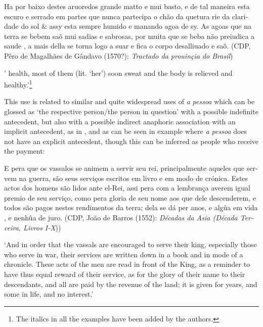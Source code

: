 \documentclass[output=paper]{langscibook}
\begin{document}
\eanoraggedright\label{ex:amaral:12}
\begin{otherlanguage}{portuguese}
Ha por baixo destes aruoredos grande matto e mui basto, e de tal maneira esta escuro e serrado em partes que nunca partecipa o chão da quetura rie da claridade do sol \& assy esta sempre humido e manando agoa de sy. As agoas que na terra se bebem saõ mui sadias e sabrosas, por muita que se beba não preiudica a saude  , a mais della se torna logo a suar e fica o corpo desalliuado e saõ. {(CDP, Pêro de Magalhães de Gândavo (1570?):} {\textit{Tractado da prouinçia do Brasil}})
\end{otherlanguage}
 {}{’}{  }{health, most of them (lit. ‘her’) soon sweat and the body is relieved and healthy.’}\footnote{The italics in all the examples have been added by the authors.}
\z 


{This use is related to similar and quite widespread uses of} {\textit{a}} {\textit{pessoa}} {which can be glossed as ‘the respective person/the person in question’ with a possible indefinite antecedent, but also with a possible indirect anaphoric association with an implicit antecedent, as in , and as can be seen in example  where} {\textit{a pessoa}} does not have an explicit antecedent, though this can be inferred as people who receive the payment:

\eanoraggedright\label{ex:amaral:13}
\begin{otherlanguage}{portuguese}
E pera que os vassalos se animem a servir seu rei, principalmente aqueles que servem na guerra, são seus serviços escritos em livro e em modo de crónica. Estes actos dos homens são lidos ante el-Rei, assi pera com a lembrança averem igual premio de seu serviço, como pera gloria de seu nome aos que dele descenderem, e todos são pagos nestes rendimentos da terra; dela se dá per anos, e algûa em vida , e nenhûa de juro. (CDP, João de Barros (1552): {\textit{Décadas da Asia (Década Terceira, Livros I-X}}))
\end{otherlanguage}
\glt ‘And in order that the vassals are encouraged to serve their king, especially those who serve in war, their services are written down in a book and in mode of a chronicle. These acts of the men are read in front of the King, as a reminder to have thus equal reward of their service, as for the glory of their name to their descendants, and all are paid by the revenue of the land; it is given for years, and some in   life, and no interest.’
\z 
\end{document}
